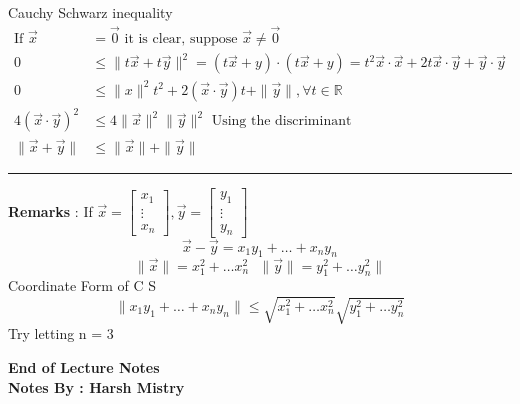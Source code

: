 \documentclass{article}
\newenvironment{proof}{{\bf Proof:}}{\hfill\rule{2mm}{2mm}}
\begin{document}
\begin{proof} Cauchy Schwarz inequality \\
\[ \begin{aligned} \text{If }  \vec{x} & = \vec{0} \text { it is clear,  suppose } \vec{x} \neq \vec{0} \\ 
0 & \leq \| t\vec{x} + t\vec{y} \| ^2 = (t\vec{x} + y) \cdot (t\vec{x} + y) = t^2 \vec{x} \cdot \vec{x} + 2t\vec{x}\cdot \vec{y} + \vec{y} \cdot \vec{y} \\
0 & \leq \|x \| ^2 t^2 + 2(\vec{x} \cdot \vec{y}) t + \|\vec{y}\| , \forall t \in \mathbb{R} \\
4 (\vec{x} \cdot \vec{y}) ^2 & \leq 4 \|\vec{x}\| ^ 2 \|\vec{y}\| ^ 2   \text{ Using the discriminant} \\
\|\vec{x} + \vec{y}\| & \leq \|\vec{x}\| + \|\vec{y}\| 
\end{aligned} \]
\end{proof}

\textbf{Remarks} : If \( \vec{x} = \begin{bmatrix} x_1 \\ \vdots \\ x_n \end{bmatrix} , \vec{y} = \begin{bmatrix} y_1 \\  \vdots \\ y_n \end{bmatrix}\) \\
\[\vec{x} - \vec{y}  = x_1y_1 + \ldots  + x_ny_n \]
\[ \| \vec{x} \| = x_1 ^2 + \ldots x_n^2 \ \ \ \| \vec{y} \| = y_1 ^2 + \ldots y_n^2 \|\]
Coordinate Form of C S 
\[\| x_1y_1 + \ldots + x_ny_n\| \leq \sqrt{x_1 ^2 + \ldots x_n^2} \sqrt{y_1 ^2 + \ldots y_n^2} \]
Try letting n = 3



\begin{center}
\textbf{End of Lecture Notes} \\
\textbf{Notes By : Harsh Mistry}
\end{center}
\end{document}
